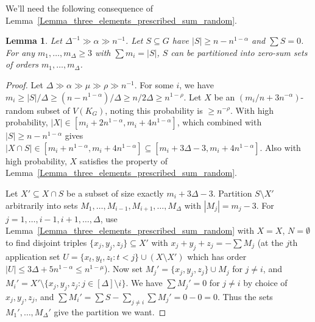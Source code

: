 \documentclass[a4paper,11pt,hidelinks]{amsart}
\newtheorem{lemma}[theorem]{Lemma}
\theoremstyle{definition}
\begin{document}
We'll need the following consequence of Lemma~\ref{Lemma_three_elements_prescribed_sum_random}.
\begin{lemma}\label{Lemma_partition_zero_sum}
Let $\Delta^{-1}\gg \alpha\gg n^{-1}$.
Let $S\subseteq G$ have $|S|\geq n-n^{1-\alpha}$ and $\sum  S=0$. For any $m_1, \dots, m_{\Delta}\geq 3$ with $\sum m_i=|S|$, $S$ can be partitioned into zero-sum sets of orders $m_1, \dots, m_{\Delta}$.
\end{lemma}
\begin{proof}
Let $\Delta\gg  \alpha\gg\mu\gg \rho\gg n^{-1}$.
For some $i$, we have $m_i\geq |S|/\Delta\geq (n-n^{1-\alpha})/\Delta\geq n/2\Delta\geq n^{1-\rho}$. Let $X$ be an $(m_i/n +3n^{-\alpha})$-random subset of $V(K_G)$, noting this probability is $\geq n^{-\rho}$. With high probability, $|X| \in [m_i+2 n^{1-\alpha}, m_i+4n^{1-\alpha}]$, which combined with $|S|\geq n-n^{1-\alpha}$ gives $|X\cap S|\in [m_i+n^{1-\alpha}, m_i+4n^{1-\alpha}]\subseteq [m_i+3\Delta-3, m_i+4n^{1-\alpha}]$. Also with high probability, $X$ satisfies the property of Lemma~\ref{Lemma_three_elements_prescribed_sum_random}.   

Let $X'\subseteq X\cap S$ be a subset of size exactly $m_i+3\Delta-3$. Partition $S\setminus X'$ arbitrarily into sets $M_1, \dots, M_{i-1}, M_{i+1}, \dots, M_{\Delta}$ with $|M_j|=m_j-3$. For $j=1, \dots, i-1, i+1, \dots, \Delta$, use Lemma~\ref{Lemma_three_elements_prescribed_sum_random} with $X=X$, $N=\emptyset$   to find disjoint triples $\{x_j, y_j, z_j\}\subseteq X'$ with $x_j+y_j+z_j=-\sum M_j$   (at the $j$th application set $U=\{x_t, y_t, z_t: t<j\}\cup (X\setminus X')$ which has order $|U|\leq 3\Delta+5n^{1-\alpha}\leq n^{1-\mu}$). Now set $M_j'=\{x_j, y_j, z_j\}\cup M_j$ for $j\neq i$, and $M_i'=X'\setminus \{x_j, y_j, z_j: j\in [\Delta]\setminus i\}$. We have $\sum M_j'=0$ for $j\neq i$ by choice of $x_j, y_j, z_j$, and $\sum M_i'=\sum S-\sum_{j\neq i} \sum M_j'=0-0=0$. Thus the sets $M_1', \dots, M_{\Delta}'$ give the partition we want. 
\end{proof}
 
\end{document}

